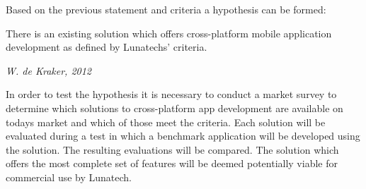 Based on the previous statement and criteria a hypothesis can be formed:
\begin{shadequote}
There is an existing solution which offers cross-platform mobile application development as defined by Lunatechs' criteria.\par\emph{W. de Kraker, 2012}
\end{shadequote}


%


In order to test the hypothesis it is necessary to conduct a market survey to determine which solutions to cross-platform app development are available on todays market and which of those meet the criteria. Each solution will be evaluated during a test in which a benchmark application will be developed using the solution. The resulting evaluations will be compared. The solution which offers the most complete set of features will be deemed potentially viable for commercial use by Lunatech. 

